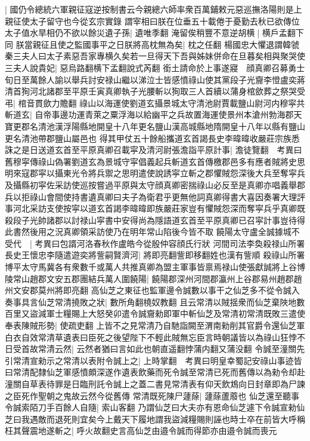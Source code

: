 |{
	國仍令總統六軍親征寇逆按制書云今親總六師率衆百萬鋪敕元惡巡撫洛陽則是上親征使太子留守也今從玄宗實錄}
謂宰相曰朕在位垂五十載倦于憂勤去秋已欲傳位太子值水旱相仍不欲以餘災遺子孫|{
	遺唯季翻}
淹留俟稍豐不意逆胡横|{
	横戶孟翻下同}
朕當親征且使之監國事平之日朕將高枕無為矣|{
	枕之任翻}
楊國忠大懼退謂韓虢秦三夫人曰太子素惡吾家專横久矣若一旦得天下吾與姊妹併命在旦暮矣相與聚哭使三夫人說貴妃|{
	惡烏路翻横下孟翻說式芮翻}
銜土請命於上事遂寢　顔真卿召募勇士旬日至萬餘人諭以舉兵討安禄山繼以涕泣士皆感憤祿山使其黨段子光齎李憕盧奕蔣清首狥河北諸郡至平原壬寅真卿執子光腰斬以狥取三人首續以蒲身棺歛葬之祭哭受弔|{
	棺音貫歛力贍翻}
祿山以海運使劉道玄攝景城太守清池尉賈載鹽山尉河内穆寜共斬道玄|{
	自帝事邊功運青萊之粟浮海以給幽平之兵故置海運使景州本滄州勃海郡天寶更郡名清池漢浮陽縣地開皇十八年更名鹽山漢高城縣地隋開皇十八年以縣有鹽山更名清池帶郡鹽山屬邑也}
得其甲仗五十餘船攜道玄首謁長史李暐暐收嚴莊宗族悉誅之是日送道玄首至平原真卿召載寜及清河尉張澹詣平原計事|{
	澹徒覽翻　考異曰舊穆寜傳祿山偽署劉道玄為景城守寜倡義起兵斬道玄首傳檄郡邑多有應者賊將史思明來寇郡寜以攝東光令將兵禦之思明遣使說誘寜立斬之郡懼賊怨深後大兵至奪寜兵及攝縣初寜佐采訪使巡按嘗過平原與太守顔真卿密揣祿山必反至是真卿亦唱義舉郡兵以拒祿山會間使持書遺真卿曰夫子為衛君乎更無他詞真卿得書大喜因奏署大理評事河北采訪支使按寜以道玄首謁李暐暐即族嚴莊家豈有懼賊怨深而奪寜兵乎真卿既殺段子光帥諸郡以討禄山寜書中安得尚為隱語道玄首至平原真卿已召寜計事豈待得此書然後用之況真卿領采訪使乃在明年常山陷後今皆不取}
饒陽太守盧全誠據城不受代　|{
	考異曰包諝河洛春秋作盧皓今從殷仲容顔氏行狀}
河間司法李奐殺禄山所署長史王懷忠李隨遣遊奕將訾嗣賢濟河|{
	將即亮翻訾即移翻姓也漢有訾順}
殺祿山所署博平太守馬冀各有衆數千或萬人共推真卿為盟主軍事皆禀焉禄山使張獻誠將上谷博陵常山趙郡文安五郡團結兵萬人圍饒陽|{
	饒陽郡深州河間郡瀛州上谷郡易州趙郡趙州文安郡莫州將即亮翻}
高仙芝之東征也監軍邊令誠數以事干之仙芝多不從令誠入奏事具言仙芝常清撓敗之狀|{
	數所角翻橈奴教翻}
且云常清以賊揺衆而仙芝棄陜地數百里又盜減軍士糧賜上大怒癸卯遣令誠齎勑即軍中斬仙芝及常清初常清既敗三遣使奉表陳賊形勢|{
	使疏吏翻}
上皆不之見常清乃自馳詣闕至渭南勑削其官爵令還仙芝軍白衣自效常清草遺表曰臣死之後望陛下不輕此賊無忘臣言時朝議皆以為祿山狂悖不日受首故常清云然|{
	云然者猶曰言如此也朝直遥翻悖蒲内翻又蒲没翻}
令誠至潼關先引常清宣勑示之常清以表附令誠上之|{
	上時掌翻　考異曰明皇幸蜀記安祿山事迹皆曰常清配隸仙芝軍感憤頗深遂作遺表飲藥而死令誠至常清已死而舊傳以為勑令却赴潼關自草表待罪是日臨刑託令誠上之蓋二書見常清表有仰天飲鴆向日封章即為尸諫之臣死作聖朝之鬼故云然今從舊傳}
常清既死陳尸蘧蒢|{
	蘧蒢蘆䕠也}
仙芝還至聽事令誠索陌刀手百餘人自隨|{
	索山客翻}
乃謂仙芝曰大夫亦有恩命仙芝遽下令誠宣勑仙芝曰我遇敵而退死則宜矣今上戴天下履地謂我盜減糧賜則誣也時士卒在前皆大呼稱枉其聲震地遂斬之|{
	呼火故翻史言高仙芝由邉令誠而得節亦由邉令誠而喪元}
